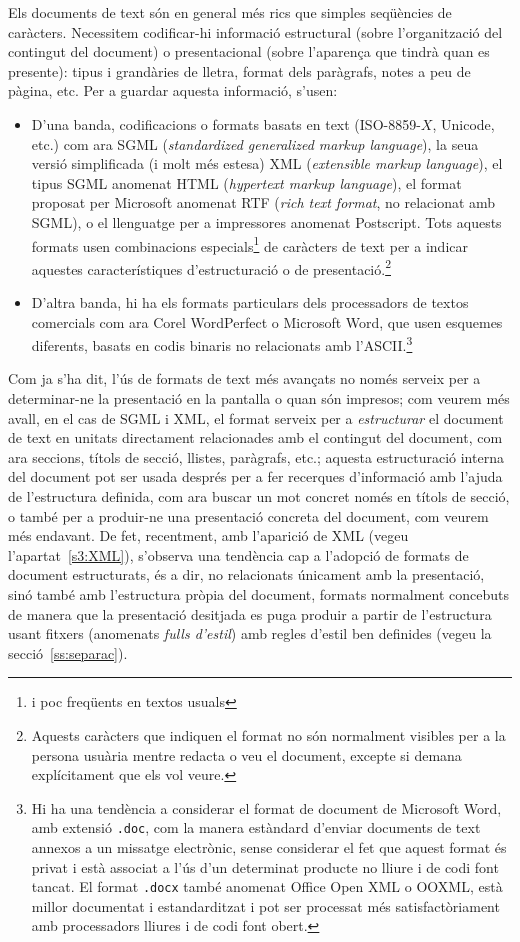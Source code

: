 Els documents de text són en general més rics que simples seqüències
de caràcters. Necessitem codificar-hi informació estructural (sobre
l'organització del contingut del document) o presentacional (sobre
l'aparença que tindrà quan es presente): tipus i grandàries de lletra,
format dels paràgrafs, notes a peu de pàgina, etc. Per a guardar
aquesta informació, s'usen:
\begin{itemize}
\item D'una banda, codificacions o formats basats en text
  (ISO-8859-$X$, Unicode, etc.) com ara SGML (\emph{standardized
    generalized markup language}), la seua versió simplificada (i molt
  més estesa) XML (\emph{extensible markup language}), el tipus SGML
  anomenat HTML (\emph{hypertext markup language}), el format proposat
  per Microsoft anomenat RTF (\emph{rich text format}, no relacionat
  amb SGML), o el llenguatge per a impressores anomenat
  Postscript. Tots aquests formats usen combinacions
  especials\footnote{i poc freqüents en textos usuals} de caràcters de
  text per a indicar aquestes característiques d'estructuració o de
  presentació.\footnote{Aquests caràcters que indiquen el format no són
    normalment visibles per a la persona usuària mentre redacta o
    veu el document, excepte si demana explícitament que els vol
    veure.} 
\item D'altra banda, hi ha els formats particulars dels processadors
  de textos comercials com ara Corel WordPerfect o Microsoft Word, que
  usen esquemes diferents, basats en codis binaris no relacionats amb
  l'ASCII.\footnote{Hi ha una tendència a considerar el format de
    document de Microsoft Word, amb extensió \texttt{.doc}, com la
    manera estàndard d'enviar documents de text annexos a un missatge
    electrònic, sense considerar el fet que aquest format és privat i
    està associat a l'ús d'un determinat producte no lliure i de codi
    font tancat. El format \texttt{.docx} també anomenat Office Open
    XML o OOXML, està millor documentat i estandarditzat i pot ser
    processat més satisfactòriament amb processadors lliures i de codi
    font obert.}
\end{itemize}
Com ja s'ha dit, l'ús de formats de text més avançats no només serveix
per a determinar-ne la presentació en la pantalla o quan són impresos;
com veurem més avall, en el cas de SGML i XML, el format serveix per a
\emph{estructurar} el document de text en unitats directament
relacionades amb el contingut del document, com ara seccions, títols
de secció, llistes, paràgrafs, etc.; aquesta estructuració interna del
document pot ser usada després per a fer recerques d'informació amb
l'ajuda de l'estructura definida, com ara buscar un mot concret només
en títols de secció, o també per a produir-ne una presentació concreta
del document, com veurem més endavant. De fet, recentment, amb
l'aparició de XML (vegeu l'apartat~\ref{s3:XML}), s'observa una tendència cap a
l'adopció de formats de document estructurats, és a dir, no
relacionats únicament amb la presentació, sinó també amb l'estructura
pròpia del document, formats normalment concebuts de manera que la
presentació desitjada es puga produir a partir de l'estructura usant
fitxers (anomenats \emph{fulls d'estil}) amb regles d'estil ben
definides (vegeu la secció~\ref{ss:separac}).

